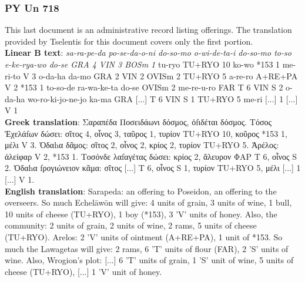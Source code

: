 \subsubsection{PY Un 718}
This last document is an administrative record listing offerings.
The translation provided by Tselentis for this document covers only the first portion. \\
\textbf{Linear B text}: \textit{sa-ra-pe-da po-se-da-o-ni do-so-mo o-wi-de-ta-i do-so-mo to-so e-ke-rya-wo do-se GRA 4 VIN 3 BOSm 1} tu-ryo TU+RYO 10 ko-wo *153 1 me-ri-to V 3 o-da-ha da-mo GRA 2 VIN 2 OVISm 2 TU+RYO 5 a-re-ro A+RE+PA V 2 *153 1 to-so-de ra-wa-ke-ta do-se OVISm 2 me-re-u-ro FAR T 6 VIN S 2 o-da-ha wo-ro-ki-jo-ne-jo ka-ma GRA [...] T 6 VIN S 1 TU+RYO 5 me-ri [...] 1 [...] V 1 \\
\textbf{Greek translation}: \textgreek{Σαραπέδα Ποσειδάωνι δόσμος, ὀfιδέται δόσμος. Τόσος Ἐχελάfων δώσει: σῖτος 4, οἶνος 3, ταῦρος 1, τυρίον TU+RYO 10, κοῦρος *153 1, μέλι V 3. Ὀδαhα δᾶμος: σῖτος 2, οἶνος 2, κρίος 2, τυρίον TU+RYO 5. Ἀρέλος: ἀλείφαρ V 2, *153 1. Τοσόνδε λαfαγέτας δώσει: κρίος 2, ἄλευρον ΦΑΡ T 6, οἶνος S 2. Ὀδαhα fρογιώνειον κᾶμα: σῖτος [...] T 6, οἶνος S 1, τυρίον TU+RYO 5, μέλι [...] 1 [...] V 1.} \\
\textbf{English translation}: Sarapeda: an offering to Poseidon, an offering to the overseers. So much Echelāwōn will give: 4 units of grain, 3 units of wine, 1 bull, 10 units of cheese (TU+RYO), 1 boy (*153), 3 'V' units of honey. Also, the community: 2 units of grain, 2 units of wine, 2 rams, 5 units of cheese (TU+RYO). Arelos: 2 'V' units of ointment (A+RE+PA), 1 unit of *153. So much the Lawagetas will give: 2 rams, 6 'T' units of flour (FAR), 2 'S' units of wine. Also, Wrogion's plot: [...] 6 'T' units of grain, 1 'S' unit of wine, 5 units of cheese (TU+RYO), [...] 1 'V' unit of honey.

